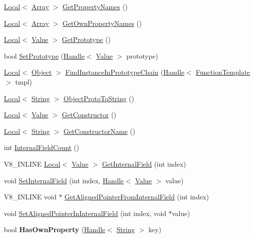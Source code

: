 \begin{DoxyCompactItemize}
\item 
\hyperlink{classv8_1_1Local}{Local}$<$ \hyperlink{classv8_1_1Array}{Array} $>$ \hyperlink{classv8_1_1Object_a9f45786246c6e6027b32f685d900a41f}{Get\-Property\-Names} ()
\item 
\hyperlink{classv8_1_1Local}{Local}$<$ \hyperlink{classv8_1_1Array}{Array} $>$ \hyperlink{classv8_1_1Object_aeb48075bdfb7b2b49fe08361a6c4d2a8}{Get\-Own\-Property\-Names} ()
\item 
\hyperlink{classv8_1_1Local}{Local}$<$ \hyperlink{classv8_1_1Value}{Value} $>$ \hyperlink{classv8_1_1Object_ae8d3fed7d6dbd667c29cabb3039fe7af}{Get\-Prototype} ()
\item 
bool \hyperlink{classv8_1_1Object_ab54bbd70d60e62d8bc22a8c8a6be593e}{Set\-Prototype} (\hyperlink{classv8_1_1Handle}{Handle}$<$ \hyperlink{classv8_1_1Value}{Value} $>$ prototype)
\item 
\hyperlink{classv8_1_1Local}{Local}$<$ \hyperlink{classv8_1_1Object}{Object} $>$ \hyperlink{classv8_1_1Object_ab2c5f7369abf08ae8f44dc84f5aa335a}{Find\-Instance\-In\-Prototype\-Chain} (\hyperlink{classv8_1_1Handle}{Handle}$<$ \hyperlink{classv8_1_1FunctionTemplate}{Function\-Template} $>$ tmpl)
\item 
\hyperlink{classv8_1_1Local}{Local}$<$ \hyperlink{classv8_1_1String}{String} $>$ \hyperlink{classv8_1_1Object_aeb2f524c806075e5f9032a24afd86869}{Object\-Proto\-To\-String} ()
\item 
\hyperlink{classv8_1_1Local}{Local}$<$ \hyperlink{classv8_1_1Value}{Value} $>$ \hyperlink{classv8_1_1Object_a6265087e94f67370247cbc7beeedac62}{Get\-Constructor} ()
\item 
\hyperlink{classv8_1_1Local}{Local}$<$ \hyperlink{classv8_1_1String}{String} $>$ \hyperlink{classv8_1_1Object_a7bbe987794658f20a3ec1b68326305e6}{Get\-Constructor\-Name} ()
\item 
int \hyperlink{classv8_1_1Object_aaec28576353eebe6fee113bce2718ecc}{Internal\-Field\-Count} ()
\item 
V8\-\_\-\-I\-N\-L\-I\-N\-E \hyperlink{classv8_1_1Local}{Local}$<$ \hyperlink{classv8_1_1Value}{Value} $>$ \hyperlink{classv8_1_1Object_aa3324fdf652d8ac3b2f27faa0559231d}{Get\-Internal\-Field} (int index)
\item 
void \hyperlink{classv8_1_1Object_a361b1781e7db29b17b063ef31315989e}{Set\-Internal\-Field} (int index, \hyperlink{classv8_1_1Handle}{Handle}$<$ \hyperlink{classv8_1_1Value}{Value} $>$ value)
\item 
V8\-\_\-\-I\-N\-L\-I\-N\-E void $\ast$ \hyperlink{classv8_1_1Object_a435f68bb7ef0f64dd522c5c910682448}{Get\-Aligned\-Pointer\-From\-Internal\-Field} (int index)
\item 
void \hyperlink{classv8_1_1Object_a0ccba69581f0b5e4e672bab90f26879b}{Set\-Aligned\-Pointer\-In\-Internal\-Field} (int index, void $\ast$value)
\item 
\hypertarget{classv8_1_1Object_a3ec4bcaa4e875987cc1845820a733777}{bool {\bfseries Has\-Own\-Property} (\hyperlink{classv8_1_1Handle}{Handle}$<$ \hyperlink{classv8_1_1String}{String} $>$ key)}\label{classv8_1_1Object_a3ec4bcaa4e875987cc1845820a733777}


\end{DoxyCompactItemize}
